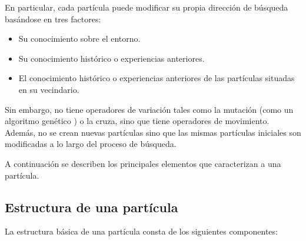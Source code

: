   En particular, cada part\'icula puede modificar su propia direcci\'on de b\'usqueda bas\'andose en tres factores:
  
  \begin{itemize}
   \item Su conocimiento sobre el entorno. 
   \item Su conocimiento hist\'orico o experiencias anteriores.
   \item El conocimiento hist\'orico o experiencias anteriores de las part\'iculas situadas en su vecindario.
  \end{itemize}
  
  Sin embargo, no tiene operadores de variaci\'on tales como la mutaci\'on (como un algoritmo gen\'etico \cite{YanNSA}) o la cruza, sino que tiene 
  operadores de movimiento. Adem\'as, no se crean nuevas part\'iculas sino que las mismas part\'iculas iniciales son modificadas a 
  lo largo del proceso de b\'usqueda. 
   
  A continuaci\'on se describen los principales elementos que caracterizan a una part\'icula.
    
    \subsection{Estructura de una part\'icula}
   
  La estructura b\'asica de una part\'icula consta de los siguientes componentes:
  
